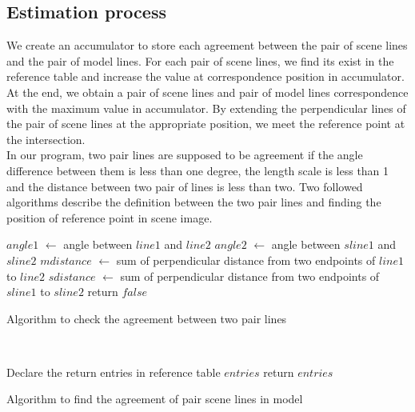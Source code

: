 \subsection{Estimation process}
We create an accumulator to store each agreement between the pair of scene lines and the pair of model lines. For each pair of scene lines, we find its exist in the reference table and increase the value at correspondence position in accumulator. At the end, we obtain a pair of scene lines and pair of model lines correspondence with the maximum value in accumulator. By extending the perpendicular lines of the pair of scene lines at the appropriate position, we meet the reference point at the intersection.\\[0.2cm]
In our program, two pair lines are supposed to be agreement if the angle difference between them is less than one degree, the length scale is less than 1 and the distance between two pair of lines is less than two. Two followed algorithms describe the definition between the two pair lines and finding the position of reference point in scene image.\\[0.2cm]
\begin{algorithm}[H]
\Indm 
{}
\SetAlgoLined
{}
\Indp
$angle1$ $\leftarrow$ angle between $line1$ and $line2$\;
$angle2$ $\leftarrow$ angle between $sline1$ and $sline2$\;
$mdistance$ $\leftarrow$ sum of perpendicular distance from two endpoints of $line1$ to $line2$\;
$sdistance$ $\leftarrow$ sum of perpendicular distance from two endpoints of $sline1$ to $sline2$\;
return $false$ \;
\caption{Algorithm to check the agreement between two pair lines}
\end{algorithm}~\\[0.2cm]
\begin{algorithm}[H]
\Indm 
{}
\SetAlgoLined
{}
\Indp
Declare the return entries in reference table $entries$ \;
return $entries$ \;
\caption{Algorithm to find the agreement of pair scene lines in model}
\end{algorithm}~\\[0.2cm]
